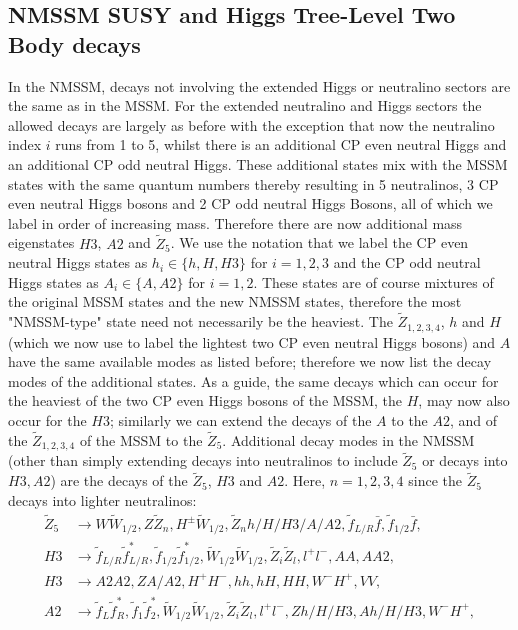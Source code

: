 \documentclass[final,3p,times]{elsarticle}
\begin{document}
\subsection{NMSSM SUSY and Higgs Tree-Level Two Body decays}
In the NMSSM, decays not involving the extended Higgs or neutralino sectors
are the same as in the MSSM\@. For the extended neutralino and Higgs sectors the
allowed decays are largely as before with the exception that now the
neutralino index $i$ runs from 1 to 5, whilst there is an additional CP even neutral
Higgs and an additional CP odd neutral Higgs. These additional states mix with the 
MSSM states with the same quantum numbers thereby resulting in 5 neutralinos, 3 CP
even neutral Higgs bosons and 2 CP odd neutral Higgs Bosons, all of which we label in order
of increasing mass. Therefore there are now additional mass eigenstates $H3$, $A2$ and $\tilde{Z}_5$.
We use the notation that we label the CP even neutral Higgs states as $h_i \in \{h,H,H3\}$ for $i=1,2,3$ and the CP odd neutral Higgs states as $A_i \in \{A,A2\}$ for $i=1,2$.
These states are of course mixtures of the original MSSM states and the new NMSSM states, therefore the most "NMSSM-type" state need not necessarily be the heaviest.
The $\tilde{Z}_{1,2,3,4}$, $h$ and $H$ (which we now use to label the lightest two CP even neutral Higgs
bosons) and $A$ have the same available modes as listed before; therefore we now list the decay
modes of the additional states. As a guide, the same decays which can occur for the heaviest
of the two CP even Higgs bosons of the MSSM, the $H$, may now also occur for the $H3$; similarly
we can extend the decays of the $A$ to the $A2$, and of the $\tilde{Z}_{1,2,3,4}$ of the MSSM
to the $\tilde{Z}_5$. Additional decay modes in the NMSSM (other than simply extending decays into
neutralinos to include $\tilde Z_5$ or decays into $H3, A2$) are the decays of
the $\tilde{Z}_5$, $H3$ and $A2$. Here, $n=1,2,3,4$ since the $\tilde{Z}_5$
decays into lighter neutralinos: 
\begin{align*}
\tilde{Z}_5 &\rightarrow W \tilde{W}_{1/2}, Z \tilde{Z}_n, H^{\pm}
              \tilde{W}_{1/2}, \tilde{Z}_n h/H/H3/A/A2,  \tilde{f}_{L/R}
              \bar{f}, \tilde{f}_{1/2} \bar{f} , \\
H3 &\rightarrow \tilde{f}_{L/R} \tilde{f}_{L/R}^*, \tilde{f}_{1/2}
     \tilde{f}_{1/2}^*, \tilde{W}_{1/2} \tilde{W}_{1/2},  \tilde{Z}_i
     \tilde{Z}_l, l^+ l^-, AA, A A2, \\
H3 &\rightarrow A2 A2, Z A/A2, H^+ H^-, hh, hH, HH, W^- H^+, VV , \\
A2 &\rightarrow \tilde{f}_{L} \tilde{f}_{R}^*, \tilde{f}_{1} \tilde{f}_{2}^*, \tilde{W}_{1/2} \tilde{W}_{1/2},  \tilde{Z}_i \tilde{Z}_l, l^+ l^-, Z h/H/H3, A h/H/H3, W^- H^+ ,
\end{align*}
\end{document}
